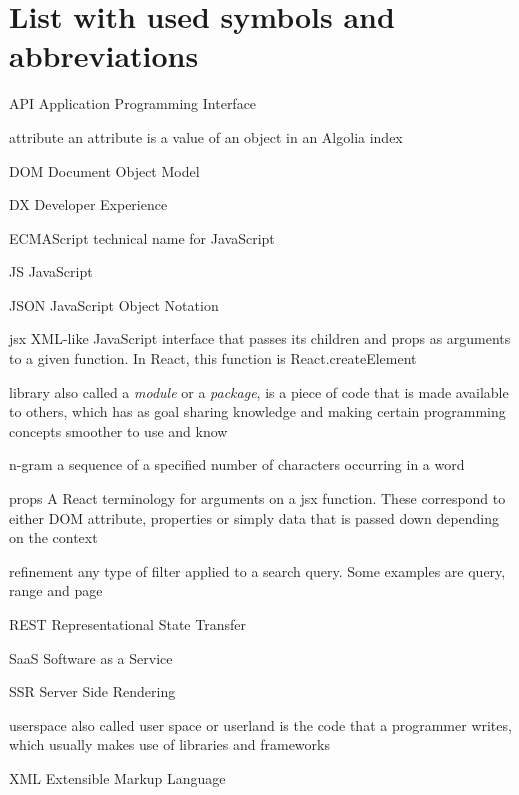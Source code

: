 
\chapter{List with used symbols and abbreviations}

\begin{abbreviations}
\item[API] Application Programming Interface
\item[attribute] an attribute is a value of an object in an Algolia index
\item[DOM] Document Object Model
\item[DX] Developer Experience
\item[ECMAScript] technical name for JavaScript
\item[JS] JavaScript
\item[JSON] JavaScript Object Notation
\item[jsx] XML-like JavaScript interface that passes its children and props as arguments to a given function. In React, this function is React.createElement
\item[library] also called a \emph{module} or a \emph{package}, is a piece of code that is made available to others, which has as goal sharing knowledge and making certain programming concepts smoother to use and know
\item[n-gram] a sequence of a specified number of characters occurring in a word\cite{kimbrell1988searching}
\item[props] A React terminology for arguments on a jsx function. These correspond to either DOM attribute, properties or simply data that is passed down depending on the context
\item[refinement] any type of filter applied to a search query. Some examples are query, range and page
\item[REST] Representational State Transfer\cite{fielding2000architectural}
\item[SaaS] Software as a Service
\item[SSR] Server Side Rendering
\item[userspace] also called user space or userland is the code that a programmer writes, which usually makes use of libraries and frameworks
\item[XML] Extensible Markup Language
\end{abbreviations}
